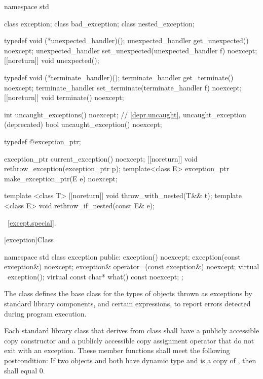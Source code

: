 %
%
\begin{codeblock}
namespace std {
  class exception;
  class bad_exception;
  class nested_exception;

  typedef void (*unexpected_handler)();
  unexpected_handler get_unexpected() noexcept;
  unexpected_handler set_unexpected(unexpected_handler f) noexcept;
  [[noreturn]] void unexpected();

  typedef void (*terminate_handler)();
  terminate_handler get_terminate() noexcept;
  terminate_handler set_terminate(terminate_handler f) noexcept;
  [[noreturn]] void terminate() noexcept;

  int uncaught_exceptions() noexcept;
  // \ref{depr.uncaught}, uncaught_exception (deprecated)
  bool uncaught_exception() noexcept;

  typedef @\unspec@ exception_ptr;

  exception_ptr current_exception() noexcept;
  [[noreturn]] void rethrow_exception(exception_ptr p);
  template<class E> exception_ptr make_exception_ptr(E e) noexcept;

  template <class T> [[noreturn]] void throw_with_nested(T&& t);
  template <class E> void rethrow_if_nested(const E& e);
}
\end{codeblock}

\xref~\ref{except.special}.

[exception]{Class }

%
\begin{codeblock}
namespace std {
  class exception {
  public:
    exception() noexcept;
    exception(const exception&) noexcept;
    exception& operator=(const exception&) noexcept;
    virtual ~exception();
    virtual const char* what() const noexcept;
  };
}
\end{codeblock}

\pnum
The class
defines the base
class for the types of objects thrown as exceptions by
\Cpp standard library components, and certain
expressions, to report errors detected during program execution.

\pnum
Each standard library class  that derives from class  shall have a
publicly accessible copy constructor and a publicly accessible copy assignment
operator that do not exit with an exception. These member functions shall meet
the following postcondition: If two objects  and  both have
dynamic type  and  is a copy of , then
 shall equal 0.

